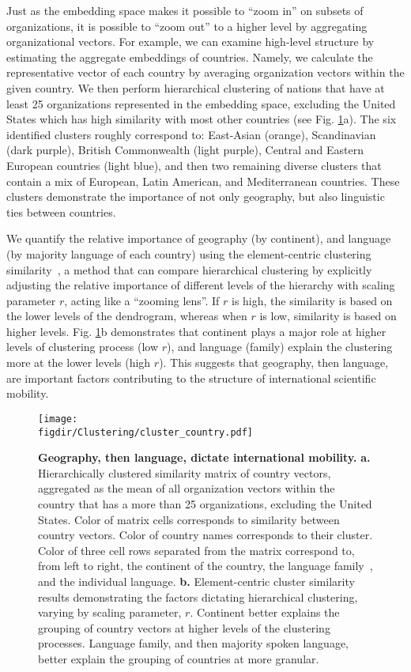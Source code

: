 \documentclass[12pt]{article} %
\def\figdir{../Figs}
\begin{document}
Just as the embedding space makes it possible to ``zoom in'' on subsets of organizations, it is possible to ``zoom out'' to a higher level by aggregating organizational vectors. 
For example, we can examine high-level structure by estimating the aggregate embeddings of countries. 
Namely, we calculate the representative vector of each country by averaging organization vectors within the given country.
We then perform hierarchical clustering of nations that have at least 25 organizations represented in the embedding space, excluding the United States which has high similarity with most other countries (see Fig. \ref{fig:clustering}a). 
The six identified clusters roughly correspond to: East-Asian (orange), Scandinavian (dark purple), British Commonwealth (light purple), Central and Eastern European countries (light blue), and then two remaining diverse clusters that contain a mix of European, Latin American, and Mediterranean countries.
These clusters demonstrate the importance of not only geography, but also linguistic ties between countries.

We quantify the relative importance of geography (by continent), and language (by majority language of each country) using the element-centric clustering similarity~\autocite{gates2019element}, a method that can compare hierarchical clustering by explicitly adjusting the relative importance of different levels of the hierarchy with scaling parameter $r$, acting like a ``zooming lens''.
If $r$ is high, the similarity is based on the lower levels of the dendrogram, whereas when $r$ is low, similarity is based on higher levels.
Fig. \ref{fig:clustering}b demonstrates that continent plays a major role at higher levels of clustering process (low $r$), and language (family) explain the clustering more at the lower levels (high $r$).
This suggests that geography, then language, are important factors contributing to the structure of international scientific mobility.

%
%
\begin{figure}[p!]
	\centering
	\texttt{[image: \\figdir/Clustering/cluster\_country.pdf]}
	\caption{
		\textbf{Geography, then language, dictate international mobility.}
		\textbf{a.} Hierarchically clustered similarity matrix of country vectors, aggregated as the mean of all organization vectors within the country that has a more than 25 organizations, excluding the United States.
		Color of matrix cells corresponds to similarity between country vectors.
		Color of country names corresponds to their cluster.
		Color of three cell rows separated from the matrix correspond to, from left to right, the continent of the country, the language family~\autocite{ethnologue}, and the individual language.
		\textbf{b.}	Element-centric cluster similarity~\autocite{gates2019element} results demonstrating the factors dictating hierarchical clustering, varying by scaling parameter, $r$.
		Continent better explains the grouping of country vectors at higher levels of the clustering processes.
		Language family, and then majority spoken language, better explain the grouping of countries at more granular.
	}
	\label{fig:clustering}
\end{figure}
\end{document}
